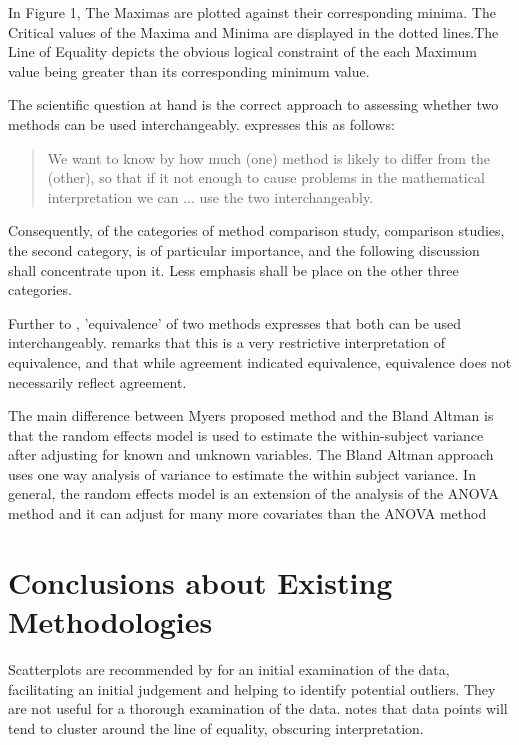 \documentclass[Main.tex]{subfiles}
\begin{document}
In Figure 1,  The Maximas are plotted against their corresponding
minima. The Critical values of the Maxima and Minima are displayed
in the dotted lines.The Line of Equality depicts the obvious
logical constraint of the each Maximum value being greater than
its corresponding minimum value.



The scientific question at hand is the correct approach to
assessing whether two methods can be used interchangeably.
\citet{BA99} expresses this as follows:
\begin{quote}We want to
	know by how much (one) method is likely to differ from the
	(other), so that if it not enough to cause problems in the
	mathematical interpretation we can ... use the two
	interchangeably.
\end{quote}



Consequently, of the categories of method comparison study,
comparison studies, the second category, is of particular
importance, and the following discussion shall concentrate upon
it. Less emphasis shall be place on the other three categories.

\bigskip Further to \citet{BA86}, 'equivalence' of two methods expresses
that both can be used interchangeably.
\citet[p.49]{DunnSEME} remarks that this is a very restrictive
interpretation of equivalence, and that while agreement indicated
equivalence, equivalence does not necessarily reflect agreement.

The main difference between Myers proposed method and the Bland
Altman is that the random effects model is used to estimate the
within-subject variance after adjusting for known and unknown
variables. The Bland Altman approach uses one way analysis of
variance to estimate the within subject variance. In general, the
random effects model is an extension of the analysis of the ANOVA
method and it can adjust for many more covariates than the ANOVA
method






\newpage
\section{Conclusions about Existing Methodologies}

Scatterplots are recommended by \citet{BA83} for an initial
examination of the data, facilitating an initial judgement and
helping to identify potential outliers. They are not useful for a
thorough examination of the data. \citet{BritHypSoc} notes that
data points will tend to cluster around the line of equality,
obscuring interpretation.
\end{document}
